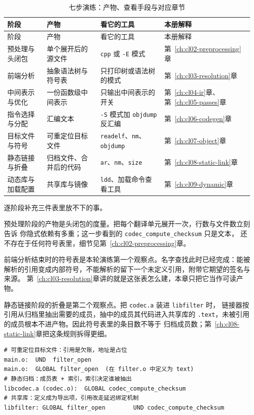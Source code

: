 \documentclass[12pt,a4paper,fontset=fandol]{ctexbook}
\newcommand{\Tp}[1]{\texttt{#1}}
\newcommand{\Tool}[1]{\texttt{#1}}
\newcommand{\Sw}[1]{\texttt{#1}}
\newcommand{\Sect}[1]{\texttt{.#1}}
\newcommand{\Sym}[1]{\texttt{#1}}
\begin{document}
\begin{longtable}{@{}>{\raggedright\arraybackslash}p{} >{\raggedright\arraybackslash}p{} >{\raggedright\arraybackslash}p{} >{\raggedright\arraybackslash}p{}@{}}
\caption{七步演练：产物、查看手段与对应章节}\label{tab:cl15-stages}\\
\toprule
阶段 & 产物 & 看它的工具 & 本册解释 \\
\midrule
\endfirsthead
\toprule
阶段 & 产物 & 看它的工具 & 本册解释 \\
\midrule
\endhead
预处理与头闭包 & 单个展开后的源文件 & \Tool{cpp} 或 \Sw{-E} 模式 &
第~\ref{ch:cl02-preprocessing}章 \\
前端分析 & 抽象语法树与符号表 & 只打印树或语法树的模式 &
第~\ref{ch:cl03-resolution}章 \\
中间表示与优化 & 一份函数级中间表示 & 只输出中间表示的开关 &
第~\ref{ch:cl04-ir}章、第~\ref{ch:cl05-passes}章 \\
指令选择与分配 & 汇编文本 & \Sw{-S} 模式加 \Tool{objdump} 反汇编 &
第~\ref{ch:cl06-codegen}章 \\
目标文件与符号 & 可重定位目标文件 & \Tool{readelf}、\Tool{nm}、\Tool{objdump} &
第~\ref{ch:cl07-object}章 \\
静态链接与折叠 & 归档文件、合并后的代码 & \Tool{ar}、\Tool{nm}、\Tool{size} &
第~\ref{ch:cl08-static-link}章 \\
动态库与加载配置 & 共享库与镜像 & \Tool{ldd}、加载命令查看工具 &
第~\ref{ch:cl09-dynamic}章 \\
\end{longtable}

逐阶段补充三件表里放不下的事。

预处理阶段的产物是头闭包的度量。把每个翻译单元展开一次，行数与文件数立刻告诉
你隐式依赖有多重；这一步看到的 \Sym{codec\_compute\_checksum} 只是文本，
还不存在于任何符号表里，细节见第~\ref{ch:cl02-preprocessing}章。

前端分析结束时的符号表是本轮演练第一个观察点。名字查找此时已经完成：能被
解析的引用变成内部符号，不能解析的留下一个未定义引用，附带它期望的签名与来源。
第~\ref{ch:cl03-resolution}章讲的就是这张表怎么建，本章只把它当作可读产物。

静态链接阶段的折叠是第二个观察点。把 \Tp{codec.a} 装进 \Tp{libfilter} 时，
链接器按引用从归档里抽出需要的成员，抽中的成员其代码进入共享库的
\Sect{text}，未被引用的成员根本不进产物。因此符号表里的条目数不等于
归档成员数；第~\ref{ch:cl08-static-link}章把这条规则拆得更细。

\begin{lstlisting}[style=outstyle, caption={同一份构建在三个阶段留下的符号线索（示意输出，非本仓库实测值）}]
# 可重定位目标文件：引用是欠账，地址是占位
main.o:  UND  filter_open
main.o:  GLOBAL filter_open  (在 filter.o 中定义为 text)
# 静态归档：成员表 + 索引，索引决定谁被抽出
libcodec.a (codec.o):  GLOBAL codec_compute_checksum
# 共享库：定义成为导出项，引用改走延迟绑定机制
libfilter: GLOBAL filter_open        UND codec_compute_checksum
\end{lstlisting}
\end{document}
